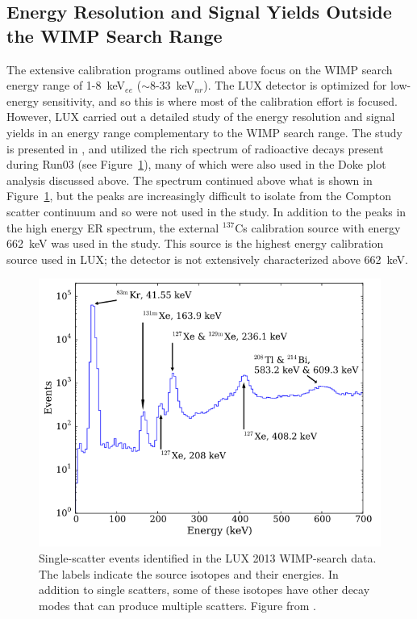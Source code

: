 \subsection{Energy Resolution and Signal Yields Outside the WIMP Search Range}
\label{sec:highenergyyeilds}
The extensive calibration programs outlined above focus on the \ac{WIMP} search energy range of 1-8~keV$_{ee}$ ($\sim$8-33~keV$_{nr}$). The \ac{LUX} detector is optimized for low-energy sensitivity, and so this is where most of the calibration effort is focused. However, \ac{LUX} carried out a detailed study of the energy resolution and signal yields in an energy range complementary to the \ac{WIMP} search range. The study is presented in \cite{LUX:YieldsAndRecombination}, and utilized the rich spectrum of radioactive decays present during Run03 (see Figure~\ref{fig:luxspectrum}), many of which were also used in the Doke plot analysis discussed above. The spectrum continued above what is shown in Figure~\ref{fig:luxspectrum}, but the peaks are increasingly difficult to isolate from the Compton scatter continuum and so were not used in the study. In addition to the peaks in the high energy \ac{ER} spectrum, the external $^{137}$Cs calibration source with energy 662~keV was used in the study. This source is the highest energy calibration source used in \ac{LUX}; the detector is not extensively characterized above 662~keV. 

\begin{figure}[htbp]
\begin{center}
\includegraphics[width=\textwidth]{figures/lux/luxspectrum.png}
\caption{Single-scatter events identified in the \acs{LUX} 2013 \acs{WIMP}-search data. The labels indicate the source isotopes and their energies. In addition to single scatters, some of these isotopes have other decay modes that can produce multiple scatters. Figure from \cite{LUX:YieldsAndRecombination}.}
\label{fig:luxspectrum}
\end{center}
\end{figure}

